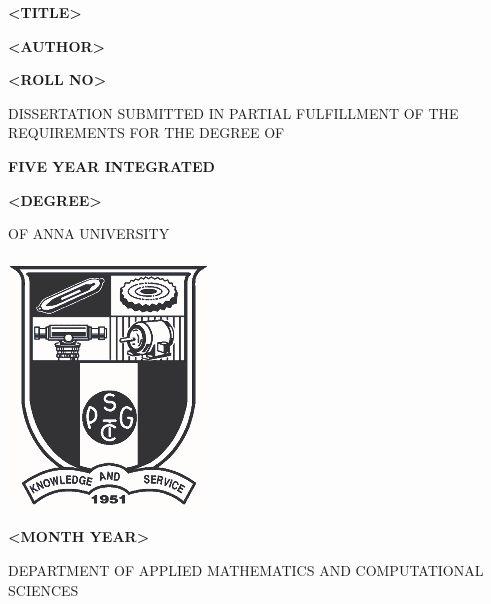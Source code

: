 \begin{titlepage}
    \begin{center}
        
        {\Large\textbf{<TITLE>}}
    
        \large
        \vspace{1.5cm}
            
        \textbf{<AUTHOR>}
        
        \vspace{0.1cm}
        
        \textbf{<ROLL NO>}
        \vspace{1.5cm}
            
        {DISSERTATION SUBMITTED IN PARTIAL FULFILLMENT OF
        THE REQUIREMENTS FOR THE DEGREE OF}

        \vspace{0.5cm}
        
        \textbf{{FIVE YEAR INTEGRATED}}

        \vspace{0.1cm}
        \textbf{<DEGREE>}
        
        \vspace{1.5cm}

        {OF ANNA UNIVERSITY}

        \vspace{0.5cm}
            
        \includegraphics[scale=0.4]{uni.png}
    
        \vspace{0.5cm}

        \textbf{<MONTH YEAR>}

        \vspace{1.5cm}

        {DEPARTMENT OF APPLIED MATHEMATICS AND COMPUTATIONAL SCIENCES}
        

\end{center}
\end{titlepage}
